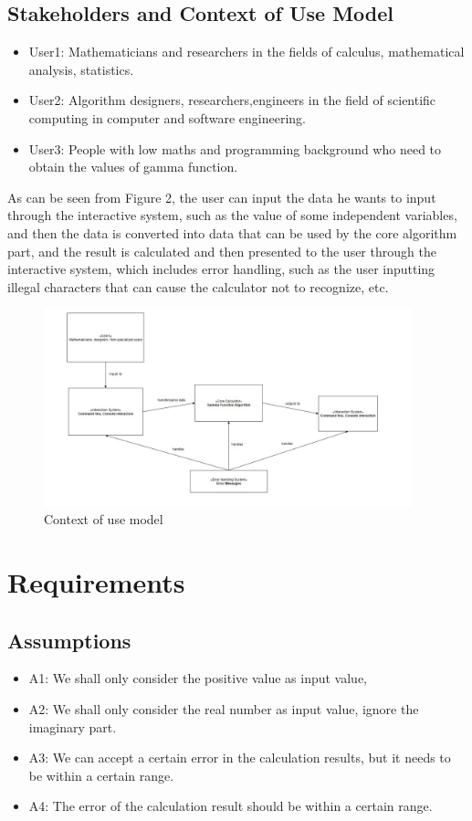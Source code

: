 \documentclass{report}
\begin{document}
\subsection{Stakeholders and Context of Use Model}
\begin{itemize}
\item User1: Mathematicians and researchers in the fields of calculus, mathematical analysis, statistics.
\item User2: Algorithm designers, researchers,engineers in the field of scientific computing in computer and software engineering.
\item User3: People with low maths and programming background who need to obtain the values of gamma function.
\end{itemize}
As can be seen from Figure 2, the user can input the data he wants to input through the interactive system, such as the value of some independent variables, and then the data is converted into data that can be used by the core algorithm part, and the result is calculated and then presented to the user through the interactive system, which includes error handling, such as the user inputting illegal characters that can cause the calculator not to recognize, etc.
\begin{figure}[h]
\caption{Context of use model}
\centering
\includegraphics[width=0.95\textwidth]{context of use}
\end{figure}



\section{Requirements}
\subsection{Assumptions}
\begin{itemize}
\item A1: We shall only consider the positive value as input value, 
\item A2: We shall only consider the real number as input value, ignore the imaginary part.
\item A3: We can accept a certain error in the calculation results, but it needs to be within a certain range.
\item A4: The error of the calculation result should be within a certain range.
\end{itemize}
\end{document}
